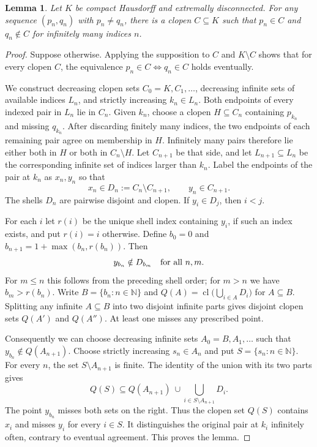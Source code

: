 \documentclass[11pt]{article}
\newtheorem{lemma}[theorem]{Lemma}
\newcommand{\N}{\mathbb N}
\newcommand{\cl}{\operatorname{cl}}
\begin{document}
\begin{lemma}\label{pair}
Let $K$ be compact Hausdorff and extremally disconnected. For any
sequence $(p_n,q_n)$ with $p_n\ne q_n$, there is a clopen
$C\subseteq K$ such that $p_n\in C$ and $q_n\notin C$ for infinitely
many indices $n$.
\end{lemma}
\begin{proof}
Suppose otherwise. Applying the supposition to $C$ and $K\setminus C$
shows that for every clopen $C$, the equivalence
$p_n\in C\Longleftrightarrow q_n\in C$ holds eventually.

We construct decreasing clopen sets $C_0=K,C_1,\ldots$, decreasing
infinite sets of available indices $L_n$, and strictly increasing
$k_n\in L_n$. Both endpoints of every indexed pair in $L_n$ lie in
$C_n$. Given $k_n$, choose a clopen $H\subseteq C_n$ containing
$p_{k_n}$ and missing $q_{k_n}$. After discarding finitely many
indices, the two endpoints of each remaining pair agree on membership
in $H$. Infinitely many pairs therefore lie either both in $H$ or
both in $C_n\setminus H$. Let $C_{n+1}$ be that side, and let
$L_{n+1}\subseteq L_n$ be the corresponding infinite set of indices
larger than $k_n$. Label the endpoints of the pair at $k_n$ as
$x_n,y_n$ so that
\[
 x_n\in D_n:=C_n\setminus C_{n+1},\qquad y_n\in C_{n+1}.
\]
The shells $D_n$ are pairwise disjoint and clopen. If $y_i\in D_j$,
then $i<j$.

For each $i$ let $r(i)$ be the unique shell index containing $y_i$,
if such an index exists, and put $r(i)=i$ otherwise. Define
$b_0=0$ and $b_{n+1}=1+\max(b_n,r(b_n))$. Then
\[
 y_{b_n}\notin D_{b_m}\quad\hbox{for all }n,m.
\]
For $m\le n$ this follows from the preceding shell order; for $m>n$
we have $b_m>r(b_n)$. Write $B=\{b_n:n\in\N\}$ and
$Q(A)=\cl\bigl(\bigcup_{i\in A}D_i\bigr)$ for $A\subseteq B$.
Splitting any infinite $A\subseteq B$ into two disjoint infinite parts
gives disjoint clopen sets $Q(A')$ and $Q(A'')$. At least one misses
any prescribed point.

Consequently we can choose decreasing infinite sets
$A_0=B,A_1,\ldots$ such that $y_{b_n}\notin Q(A_{n+1})$.
Choose strictly increasing $s_n\in A_n$ and put $S=\{s_n:n\in\N\}$.
For every $n$, the set $S\setminus A_{n+1}$ is finite. The identity
of the union with its two parts gives
\[
 Q(S)\subseteq Q(A_{n+1})\ \cup\!
 \bigcup_{i\in S\setminus A_{n+1}}D_i.
\]
The point $y_{b_n}$ misses both sets on the right. Thus the clopen
set $Q(S)$ contains $x_i$ and misses $y_i$ for every $i\in S$.
It distinguishes the original pair at $k_i$ infinitely often,
contrary to eventual agreement. This proves the lemma.
\end{proof}
\end{document}
